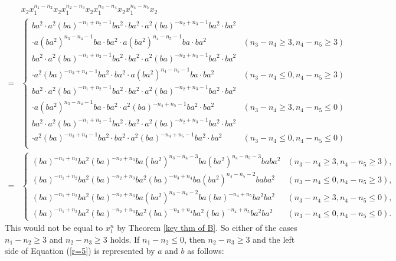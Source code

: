 \documentclass{amsart}
\theoremstyle{plain}
\theoremstyle{definition}
\begin{document}
{\allowdisplaybreaks
\begin{align*}
& x_2x_1^{n_1-n_2}x_2x_1^{n_2-n_3}x_2x_1^{n_3-n_4}x_2x_1^{n_4-n_5}x_2 \\
= & \begin{cases}
ba^2\cdot a^2(ba)^{-n_1+n_2-1}ba^2\cdot ba^2\cdot a^2(ba)^{-n_2+n_3-1}ba^2\cdot ba^2 \\
\cdot a(ba^2)^{n_3-n_4-1}ba\cdot ba^2\cdot a(ba^2)^{n_4-n_5-1}ba\cdot ba^2 & (n_3-n_4\geq 3, n_4-n_5\geq 3) \\
ba^2\cdot a^2(ba)^{-n_1+n_2-1}ba^2\cdot ba^2\cdot a^2(ba)^{-n_2+n_3-1}ba^2\cdot ba^2 \\
\cdot a^2(ba)^{-n_3+n_4-1}ba^2\cdot ba^2\cdot a(ba^2)^{n_4-n_5-1}ba\cdot ba^2 & (n_3-n_4\leq 0, n_4-n_5\geq 3) \\
ba^2\cdot a^2(ba)^{-n_1+n_2-1}ba^2\cdot ba^2\cdot a^2(ba)^{-n_2+n_3-1}ba^2\cdot ba^2 \\
\cdot a(ba^2)^{n_3-n_4-1}ba\cdot ba^2\cdot a^2(ba)^{-n_4+n_5-1}ba^2\cdot ba^2 & (n_3-n_4\geq 3, n_4-n_5\leq 0) \\
ba^2\cdot a^2(ba)^{-n_1+n_2-1}ba^2\cdot ba^2\cdot a^2(ba)^{-n_2+n_3-1}ba^2\cdot ba^2 \\
\cdot a^2(ba)^{-n_3+n_4-1}ba^2\cdot ba^2\cdot a^2(ba)^{-n_4+n_5-1}ba^2\cdot ba^2 & (n_3-n_4\leq 0, n_4-n_5\leq 0) \\
\end{cases} \\
= & \begin{cases}
(ba)^{-n_1+n_2}ba^2(ba)^{-n_2+n_3}ba(ba^2)^{n_3-n_4-3}ba(ba^2)^{n_4-n_5-3}baba^2 & (n_3-n_4\geq 3, n_4-n_5\geq 3), \\
(ba)^{-n_1+n_2}ba^2(ba)^{-n_2+n_3}ba^2(ba)^{-n_3+n_4}ba(ba^2)^{n_4-n_5-2}baba^2 & (n_3-n_4\leq 0, n_4-n_5\geq 3), \\
(ba)^{-n_1+n_2}ba^2(ba)^{-n_2+n_3}ba(ba^2)^{n_3-n_4-2}ba(ba)^{-n_4+n_5}ba^2ba^2 & (n_3-n_4\geq 3, n_4-n_5\leq 0), \\
(ba)^{-n_1+n_2}ba^2(ba)^{-n_2+n_3}ba^2(ba)^{-n_3+n_4}ba^2(ba)^{-n_4+n_5}ba^2ba^2 & (n_3-n_4\leq 0, n_4-n_5\leq 0). 
\end{cases}
\end{align*}
}
This would not be equal to $x_1^n$ by Theorem \ref{key thm of B}. 
So either of the cases $n_1-n_2\geq 3$ and $n_2-n_3\geq 3$ holds. 
If $n_1-n_2\leq 0$, then $n_2-n_3\geq 3$ and the left side of Equation (\ref{r=5}) is represented by $a$ and $b$ as follows: 
\end{document}
